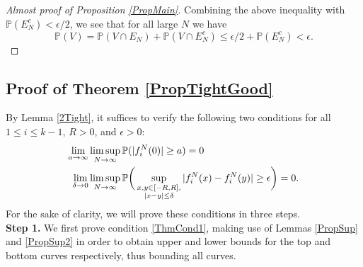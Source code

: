 \begin{proof}[Almost proof of Proposition \ref{PropMain}]
	Combining the above inequality with $\mathbb{P}(E_N^c) <  \epsilon/2$, we see that for all large $N$ we have
	$$\mathbb{P}\left( V  \right) = \mathbb{P}(V \cap E_N) + \mathbb{P}(V \cap E_N^c) \leq \epsilon/2 + \mathbb{P}(E_N^c) < \epsilon.$$
\end{proof}


%
\subsection{Proof of Theorem \ref{PropTightGood} }\label{Section4.2}
	
		By Lemma \ref{2Tight}, it suffices to verify the following two conditions for all $1\leq i\leq k-1$, $R>0$, and $\epsilon>0$:
	\begin{align}
	\lim_{a\to\infty} &\limsup_{N\to\infty} \mathbb{P}(|f^N_i(0)|\geq a) = 0 \label{ThmCond1}\\
	\lim_{\delta\to 0} &\limsup_{N\to\infty} \mathbb{P}\bigg(\sup_{\substack{x,y\in [-R,R], \\ |x-y|\leq\delta}} |f^N_i(x) - f^N_i(y)| \geq \epsilon\bigg)= 0. \label{ThmCond2}
	\end{align}
	For the sake of clarity, we will prove these conditions in three steps.\\
	
	\noindent\textbf{Step 1.} We first prove condition \eqref{ThmCond1}, making use of Lemmas \ref{PropSup} and \ref{PropSup2} in order to obtain upper and lower bounds for the top and bottom curves respectively, thus bounding all curves.
	
